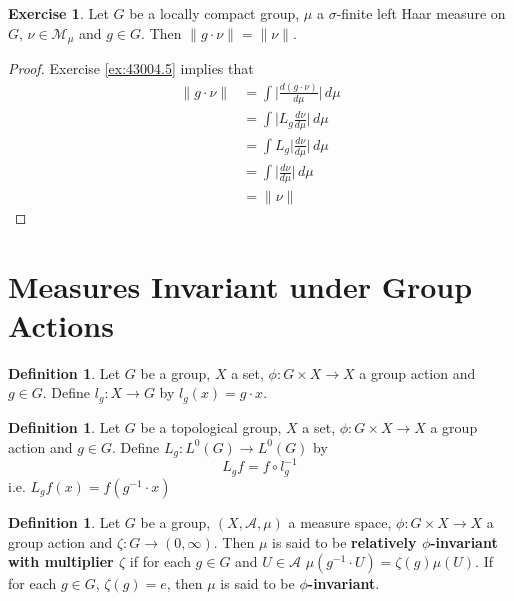 \documentclass{book}
\theoremstyle{definition}
\newtheorem{defn}[definition]{Definition}
\newtheorem{ex}[definition]{Exercise}
\newcommand{\sig}{\sigma}
\newcommand{\MA}{\mathcal{A}}
\newcommand{\MM}{\mathcal{M}}
\newcommand{\rex}[1]{Exercise \ref{ex:#1}}
\newcommand{\ld}[1]{\label{defn:#1}}
\DeclareMathOperator*{\0}{\mbf{0}}
\DeclareMathOperator*{\1}{\mbf{1}}
\newcommand{\dmu}{\, d \mu}
\begin{document}
	\begin{ex}
	Let $G$ be a locally compact group, $\mu$ a $\sig$-finite left Haar measure on $G$, $\nu \in \MM_{\mu}$ and $g \in G$. Then $\|g \cdot \nu\| = \|\nu\|$. 
	\end{ex}
	
	\begin{proof}
	\rex{43004.5} implies that
	\begin{align*}
	\|g \cdot \nu\| 
	&= \int \bigg | \frac{d (g \cdot \nu)}{d\mu} \bigg | \dmu \\
	&=  \int \bigg | L_g \frac{d \nu}{d\mu} \bigg | \dmu \\
	&= \int L_g \bigg | \frac{d \nu}{d\mu} \bigg | \dmu \\
	&= \int \bigg | \frac{d \nu}{d\mu} \bigg | \dmu \\
	&= \|\nu\|
	\end{align*}
	\end{proof}

	
	
	
	
	
	
	
	
	
	
	
	
	
	
	
	
	
	
	
	
	\newpage
	\section{Measures Invariant under Group Actions}
	\begin{defn} \ld{00000} 
		Let $G$ be a group, $X$ a set, $\phi: G \times X \rightarrow X$ a group action and $g \in G$. Define $l_g:X \rightarrow G$ by $l_g(x) = g \cdot x$. 
	\end{defn}
	
	\begin{defn} \ld{00000} 
		Let $G$ be a topological group, $X$ a set, $\phi: G \times X \rightarrow X$ a group action and $g \in G$. Define $L_g: L^0(G) \rightarrow L^0(G)$ by 
		$$L_g f = f \circ l_g^{-1}$$ 
		i.e. $L_g f(x) = f(g^{-1} \cdot x)$
	\end{defn}

	\begin{defn}
		Let $G$ be a group, $(X, \MA, \mu)$ a measure space, $\phi: G \times X \rightarrow X$ a group action and $\zeta: G \rightarrow (0, \infty)$. Then $\mu$ is said to be \textbf{relatively $\phi$-invariant with multiplier $\zeta$} if for each $g \in G$ and $U \in \MA$ $\mu(g^{-1} \cdot U) = \zeta(g) \mu(U)$. If for each $g \in G$, $\zeta(g) = e$, then $\mu$ is said to be \textbf{$\phi$-invariant}.
	\end{defn}
\end{document}
